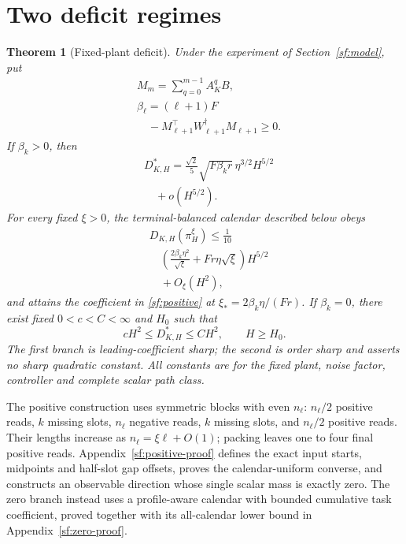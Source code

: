 \documentclass[journal]{IEEEtran}
\newtheorem{theorem}{Theorem}
\begin{document}
\section{Two deficit regimes}\label{sf:results}
\begin{theorem}[Fixed-plant deficit]\label{sf:two-regime}
Under the experiment of Section~\ref{sf:model}, put
\begin{equation}\label{sf:penalty}
\begin{aligned}
&M_m=\sum_{q=0}^{m-1}A_K^qB,\\
&\beta_\ell=(\ell+1)F\\
&\quad-M_{\ell+1}^\top W_{\ell+1}^\dagger M_{\ell+1}\ge0.
\end{aligned}
\end{equation}
If $\beta_k>0$, then
\begin{equation}\label{sf:positive}
\begin{aligned}
&D_{K,H}^*=\frac{\sqrt2}{5}\sqrt{F\beta_k r}\,\eta^{3/2}H^{5/2}\\
&\quad+o(H^{5/2}).
\end{aligned}
\end{equation}
For every fixed $\xi>0$, the terminal-balanced calendar described below obeys
\begin{equation}\label{sf:upper}
\begin{aligned}
&D_{K,H}(\pi_H^\xi)\le\frac1{10}\\
&\quad\left(\frac{2\beta_k\eta^2}{\sqrt\xi}+Fr\eta\sqrt\xi\right)H^{5/2}\\
&\quad+O_\xi(H^2),
\end{aligned}
\end{equation}
and attains the coefficient in \eqref{sf:positive} at
$\xi_*=2\beta_k\eta/(Fr)$. If $\beta_k=0$, there exist fixed
$0<c<C<\infty$ and $H_0$ such that
\begin{equation}\label{sf:zero}
cH^2\le D_{K,H}^*\le CH^2,\qquad H\ge H_0.
\end{equation}
The first branch is leading-coefficient sharp; the second is order sharp and
asserts no sharp quadratic constant. All constants are for the fixed plant,
noise factor, controller and complete scalar path class.
\end{theorem}

The positive construction uses symmetric blocks with even $n_\ell$:
$n_\ell/2$ positive reads, $k$ missing slots, $n_\ell$ negative reads,
$k$ missing slots, and $n_\ell/2$ positive reads. Their lengths increase as
$n_\ell=\xi\ell+O(1)$; packing leaves one to four final positive reads.
Appendix~\ref{sf:positive-proof} defines the exact input starts, midpoints
and half-slot gap offsets, proves the calendar-uniform converse, and constructs
an observable direction whose single scalar mass is exactly zero.
The zero branch instead uses a profile-aware calendar with bounded cumulative
task coefficient, proved together with its all-calendar lower bound in
Appendix~\ref{sf:zero-proof}.
\end{document}
